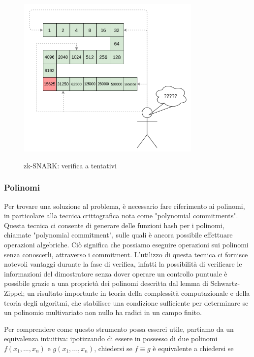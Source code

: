 \begin{figure}[H]
    \centering
    \includegraphics[width=9cm]{./chapters/1.state-of-art/images/6.hope_evaluation.png}
    \label{fig:hope-evaluation}
    \captionsetup{justification=centering}
    \caption{zk-SNARK: verifica a tentativi}
\end{figure}

\subsubsection{Polinomi}

Per trovare una soluzione al problema, è necessario fare riferimento ai polinomi, in particolare alla tecnica
crittografica nota come "polynomial commitments". Questa tecnica ci consente di generare delle funzioni hash per i
polinomi, chiamate "polynomial commitment", sulle quali è ancora possibile effettuare operazioni algebriche. Ciò
significa che possiamo eseguire operazioni sui polinomi senza conoscerli, attraverso i commitment. L'utilizzo di questa
tecnica ci fornisce notevoli vantaggi durante la fase di verifica, infatti la possibilità di verificare le informazioni
del dimostratore senza dover operare un controllo puntuale è possibile grazie a una proprietà dei polinomi descritta dal
lemma di Schwartz-Zippel; un risultato importante in teoria della complessità
computazionale e della teoria degli algoritmi, che stabilisce una condizione sufficiente per determinare se un polinomio
multivariato non nullo ha radici in un campo finito.

Per comprendere come questo strumento possa esserci utile, partiamo da un equivalenza intuitiva: ipotizzando di essere
in possesso di due polinomi $f(x_1,...,x_n)$ e $g(x_1,...,x_n)$, chiedersi se $f \equiv g$ è
equivalente a chiedersi se 

